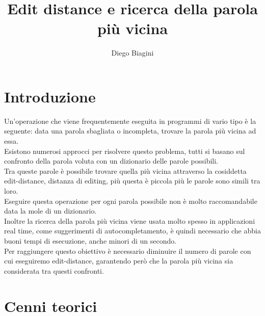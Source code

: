 \documentclass[]{article}
\author{Diego Biagini}
\title{Edit distance e ricerca della parola più vicina}
\date{}
\begin{document}
\maketitle

\section{Introduzione}
Un'operazione che viene frequentemente eseguita in programmi di vario tipo è la seguente: data una parola sbagliata o incompleta, trovare la parola più vicina ad essa.\\
Esistono numerosi approcci per risolvere questo problema, tutti si basano sul confronto della parola voluta con un dizionario delle parole possibili.\\
Tra queste parole è possibile trovare quella più vicina attraverso la cosiddetta edit-distance, distanza di editing, più questa è piccola più le parole sono simili tra loro.\\
Eseguire questa operazione per ogni parola possibile non è molto raccomandabile data la mole di un dizionario.\\
Inoltre la ricerca della parola più vicina viene usata molto spesso in applicazioni real time, come suggerimenti di autocompletamento, è quindi necessario che abbia buoni tempi di esecuzione, anche minori di un secondo.\\
Per raggiungere questo obiettivo è necessario diminuire il numero di parole con cui eseguiremo edit-distance, garantendo però che la parola più vicina sia considerata tra questi confronti.\\
\section{Cenni teorici}
\end{document}
